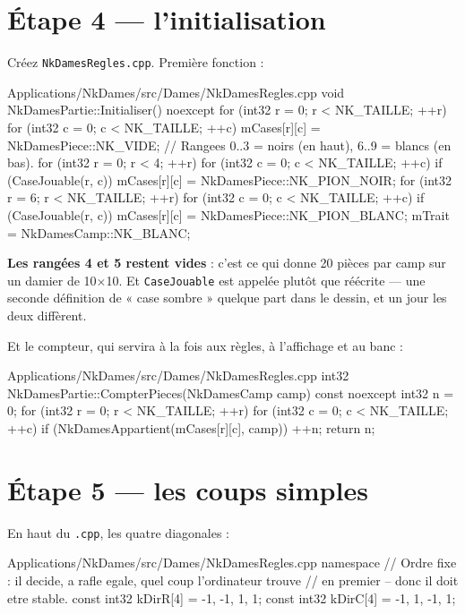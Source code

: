 \section{Étape 4 --- l'initialisation}

Créez \texttt{NkDamesRegles.cpp}. Première fonction :

\begin{nkcode}{Applications/NkDames/src/Dames/NkDamesRegles.cpp}
void NkDamesPartie::Initialiser() noexcept {
    for (int32 r = 0; r < NK_TAILLE; ++r) {
        for (int32 c = 0; c < NK_TAILLE; ++c) {
            mCases[r][c] = NkDamesPiece::NK_VIDE;
        }
    }
    // Rangees 0..3 = noirs (en haut), 6..9 = blancs (en bas).
    for (int32 r = 0; r < 4; ++r) {
        for (int32 c = 0; c < NK_TAILLE; ++c) {
            if (CaseJouable(r, c)) { mCases[r][c] = NkDamesPiece::NK_PION_NOIR; }
        }
    }
    for (int32 r = 6; r < NK_TAILLE; ++r) {
        for (int32 c = 0; c < NK_TAILLE; ++c) {
            if (CaseJouable(r, c)) { mCases[r][c] = NkDamesPiece::NK_PION_BLANC; }
        }
    }
    mTrait = NkDamesCamp::NK_BLANC;
}
\end{nkcode}

\begin{nkretenir}
\textbf{Les rangées 4 et 5 restent vides} : c'est ce qui donne 20 pièces par
camp sur un damier de 10$\times$10. Et \texttt{CaseJouable} est appelée plutôt
que réécrite --- une seconde définition de « case sombre » quelque part dans le
dessin, et un jour les deux diffèrent.
\end{nkretenir}

Et le compteur, qui servira à la fois aux règles, à l'affichage et au banc :

\begin{nkcode}{Applications/NkDames/src/Dames/NkDamesRegles.cpp}
int32 NkDamesPartie::CompterPieces(NkDamesCamp camp) const noexcept {
    int32 n = 0;
    for (int32 r = 0; r < NK_TAILLE; ++r) {
        for (int32 c = 0; c < NK_TAILLE; ++c) {
            if (NkDamesAppartient(mCases[r][c], camp)) { ++n; }
        }
    }
    return n;
}
\end{nkcode}

\section{Étape 5 --- les coups simples}

En haut du \texttt{.cpp}, les quatre diagonales :

\begin{nkcode}{Applications/NkDames/src/Dames/NkDamesRegles.cpp}
namespace {
    // Ordre fixe : il decide, a rafle egale, quel coup l'ordinateur trouve
    // en premier -- donc il doit etre stable.
    const int32 kDirR[4] = {-1, -1, 1, 1};
    const int32 kDirC[4] = {-1, 1, -1, 1};
}
\end{nkcode}

